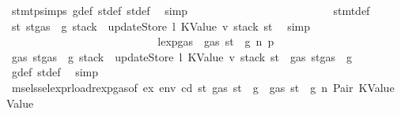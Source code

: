 \begin{isabellebody}
\ stmt{\isachardot}{\kern0pt}psimps{\isacharparenleft}{\kern0pt}{}{\isacharparenright}{\kern0pt}\ g{\isacharunderscore}{\kern0pt}def\ st{\isacharprime}{\kern0pt}{\isacharunderscore}{\kern0pt}def\ st{\isacharprime}{\kern0pt}{\isacharprime}{\kern0pt}{\isacharunderscore}{\kern0pt}def\ \isamarkupfalse%
\ simp\isanewline
\ \ \ \ \ \ \ \ \ \ \ \ \ \ \ \ \ \ \ \ \ \ \ \ \isamarkupfalse%
\ stmt{\isacharunderscore}{\kern0pt}def\ \isamarkupfalse%
\ {\isachardoublequoteopen}st{}{\isacharprime}{\kern0pt}{\isacharequal}{\kern0pt}\ st{\isacharprime}{\kern0pt}{\isacharprime}{\kern0pt}{\isasymlparr}gas\ {\isacharcolon}{\kern0pt}{\isacharequal}{\kern0pt}\ g{\isacharprime}{\kern0pt}{\isacharprime}{\kern0pt}{\isacharcomma}{\kern0pt}\ stack\ {\isacharcolon}{\kern0pt}{\isacharequal}{\kern0pt}\ updateStore\ l\ {\isacharparenleft}{\kern0pt}KValue\ v{\isacharprime}{\kern0pt}{\isacharparenright}{\kern0pt}\ {\isacharparenleft}{\kern0pt}stack\ st{\isacharparenright}{\kern0pt}{\isasymrparr}{\isachardoublequoteclose}\ \isamarkupfalse%
\ simp\isanewline
\ \ \ \ \ \ \ \ \ \ \ \ \ \ \ \ \ \ \ \ \ \ \ \ \isamarkupfalse%
\ \isamarkupfalse%
\ lexp{\isacharunderscore}{\kern0pt}gas\ {\isacharbackquoteopen}{\isasymnot}\ gas\ st\ {\isasymle}\ g{\isacharbackquoteclose}\ n{}\ p{}\ \isamarkupfalse%
\ {\isachardoublequoteopen}gas\ {\isacharparenleft}{\kern0pt}st{\isacharprime}{\kern0pt}{\isacharprime}{\kern0pt}{\isasymlparr}gas\ {\isacharcolon}{\kern0pt}{\isacharequal}{\kern0pt}\ g{\isacharprime}{\kern0pt}{\isacharprime}{\kern0pt}{\isacharcomma}{\kern0pt}\ stack\ {\isacharcolon}{\kern0pt}{\isacharequal}{\kern0pt}\ updateStore\ l\ {\isacharparenleft}{\kern0pt}KValue\ v{\isacharprime}{\kern0pt}{\isacharparenright}{\kern0pt}\ {\isacharparenleft}{\kern0pt}stack\ st{\isacharparenright}{\kern0pt}{\isasymrparr}{\isacharparenright}{\kern0pt}\ {\isasymle}\ gas\ {\isacharparenleft}{\kern0pt}st{\isacharprime}{\kern0pt}{\isasymlparr}gas\ {\isacharcolon}{\kern0pt}{\isacharequal}{\kern0pt}\ g{\isacharprime}{\kern0pt}{\isasymrparr}{\isacharparenright}{\kern0pt}{\isachardoublequoteclose}\ \isamarkupfalse%
\ g{\isacharunderscore}{\kern0pt}def\ st{\isacharprime}{\kern0pt}{\isacharunderscore}{\kern0pt}def\ \isamarkupfalse%
\ simp\isanewline
\ \ \ \ \ \ \ \ \ \ \ \ \ \ \ \ \ \ \ \ \ \ \ \ \isamarkupfalse%
\ \isamarkupfalse%
\ msel{\isacharunderscore}{\kern0pt}ssel{\isacharunderscore}{\kern0pt}expr{\isacharunderscore}{\kern0pt}load{\isacharunderscore}{\kern0pt}rexp{\isacharunderscore}{\kern0pt}gas{\isacharparenleft}{\kern0pt}{}{\isacharparenright}{\kern0pt}{\isacharbrackleft}{\kern0pt}of\ ex\ env\ cd\ st{\isacharprime}{\kern0pt}\ {\isachardoublequoteopen}gas\ st\ {\isacharminus}{\kern0pt}\ g{\isachardoublequoteclose}{\isacharbrackright}{\kern0pt}\ {\isacharbackquoteopen}{\isasymnot}\ gas\ st\ {\isasymle}\ g{\isacharbackquoteclose}\ n\ Pair\ KValue\ Value\ \isamarkupfalse%

\end{isabellebody}
